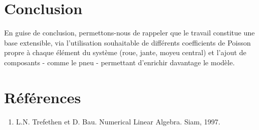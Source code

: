 \documentclass[conference]{IEEEtran}
\begin{document}
\section*{Conclusion}
En guise de conclusion, permettons-nous de rappeler que le travail constitue une base extensible, via l'utilisation souhaitable de différents coefficients de Poisson propre à chaque élément du système (roue, jante, moyeu central) et l'ajout de composants - comme le pneu - permettant d'enrichir davantage le modèle.

\section*{Références}
\begin{enumerate}
    \item L.N. Trefethen et D. Bau. Numerical Linear Algebra. Siam, 1997.
\end{enumerate}
\end{document}
